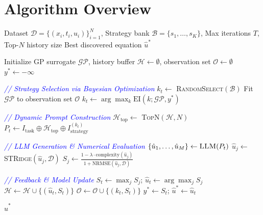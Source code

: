 \section{Algorithm Overview}
\label{app:algorithm} 

\begin{algorithm}[!htbp]
\caption{\textsc{NeuroSym-BO}: Dynamic Instruction Tuning for PDE Discovery}
\label{alg:neurosymbo}
\begin{algorithmic}[1]
\Require Dataset $\mathcal{D} = \{(x_i, t_i, u_i)\}_{i=1}^N$, Strategy bank $\mathcal{B} = \{s_1, \ldots, s_K\}$, Max iterations $T$, Top-$N$ history size
\Ensure Best discovered equation $\hat{u}^*$

\State Initialize GP surrogate $\mathcal{GP}$, history buffer $\mathcal{H} \leftarrow \emptyset$, observation set $\mathcal{O} \leftarrow \emptyset$
\State $y^* \leftarrow -\infty$ 

    \State \textcolor{blue}{\textit{// Strategy Selection via Bayesian Optimization}}
     
        \State $k_t \leftarrow$ \textsc{RandomSelect}$(\mathcal{B})$
    \Else
        \State Fit $\mathcal{GP}$ to observation set $\mathcal{O}$
        \State $k_t \leftarrow \arg\max_{k} \text{EI}(k; \mathcal{GP}, y^*)$ 
    \EndIf
    
    \State \textcolor{blue}{\textit{// Dynamic Prompt Construction}}
    \State $\mathcal{H}_{\text{top}} \leftarrow$ \textsc{TopN}$(\mathcal{H}, N)$ 
    \State $P_t \leftarrow I_{\text{task}} \oplus \mathcal{H}_{\text{top}} \oplus I_{\text{strategy}}^{(k_t)}$ 
    
    \State \textcolor{blue}{\textit{// LLM Generation \& Numerical Evaluation}}
    \State $\{\hat{u}_1, \ldots, \hat{u}_M\} \leftarrow \textsc{LLM}(P_t)$ 
        \State $\hat{u}_j \leftarrow$ \textsc{STRidge}$(\hat{u}_j, \mathcal{D})$ 
        \State $S_j \leftarrow \frac{1 - \lambda \cdot \text{complexity}(\hat{u}_j)}{1 + \text{NRMSE}(\hat{u}_j, \mathcal{D})}$ 
    \EndFor
    
    \State \textcolor{blue}{\textit{// Feedback \& Model Update}}
    \State $S_t \leftarrow \max_j S_j$; \quad $\hat{u}_t \leftarrow \arg\max_j S_j$
    \State $\mathcal{H} \leftarrow \mathcal{H} \cup \{(\hat{u}_t, S_t)\}$
    \State $\mathcal{O} \leftarrow \mathcal{O} \cup \{(k_t, S_t)\}$ 
        \State $y^* \leftarrow S_t$; \quad $\hat{u}^* \leftarrow \hat{u}_t$
    \EndIf
\EndFor

\State \Return $\hat{u}^*$
\end{algorithmic}
\end{algorithm}

